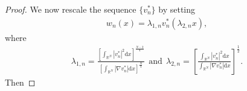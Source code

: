 \documentclass[12pt,a4paper,reqno]{amsart}
\numberwithin{equation}{section}
\begin{document}
\begin{proof}
We now rescale the sequence $\{v_{n}^{*}\}$ by setting
\begin{equation*}
\begin{aligned}
w_{n}(x)=\lambda_{1,n}v_{n}^{*}(\lambda_{2,n}x),
\end{aligned}
\end{equation*}
where
\begin{equation*}
\begin{aligned}
\lambda_{1,n}
=\frac{\left[
\int_{\mathbb{R}^{N}}|v_{n}^{*}|^{2}\mathrm{d}x
\right]^{\frac{N-2}{4}}}{\left[
\int_{\mathbb{R}^{N}}|\nabla v_{n}^{*}|\mathrm{d}x
\right]^{\frac{N}{4}}}
~~\mathrm{and}~~
\lambda_{2,n}
=
\left[
\frac{
\int_{\mathbb{R}^{N}}|v_{n}^{*}|^{2}\mathrm{d}x
}
{\int_{\mathbb{R}^{N}}|\nabla v_{n}^{*}|\mathrm{d}x}
\right]^{\frac{1}{2}}.
\end{aligned}
\end{equation*}
Then


\end{proof}
\end{document}
